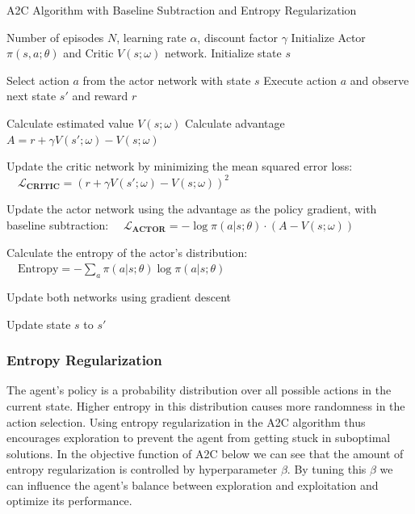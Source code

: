 \documentclass{article}
\begin{document}
\begin{algorithm}[H]
    \caption{A2C Algorithm with Baseline Subtraction and Entropy Regularization}
  \label{alg:A2C}
  \begin{algorithmic}[1]
      \REQUIRE Number of episodes $N$, learning rate $\alpha$, discount factor $\gamma$
      \STATE Initialize Actor $\pi(s, a; \theta)$ and Critic $V(s; \omega)$ network.
          \STATE Initialize state $s$
    
              \STATE Select action $a$ from the actor network with state $s$
              \STATE Execute action $a$ and observe next state $s'$ and reward $r$
      
              \STATE Calculate estimated value $V(s; \omega)$
              \STATE Calculate advantage $A = r + \gamma V(s'; \omega) - V(s; \omega)$
      
              \STATE Update the critic network by minimizing the mean squared error loss:
              \STATE $\quad \mathcal{L}_{\textbf{CRITIC}} = (r + \gamma V(s'; \omega) - V(s; \omega))^2$
      
              \STATE Update the actor network using the advantage as the policy gradient, with baseline subtraction:
              \STATE $\quad \mathcal{L}_{\textbf{ACTOR}} = -\log \pi(a|s; \theta) \cdot (A - V(s; \omega))$
      
              \STATE Calculate the entropy of the actor's distribution:
              \STATE $\quad \text{Entropy} = -\sum_{a} \pi(a|s; \theta) \log \pi(a|s; \theta)$
      
              \STATE Update both networks using gradient descent
      
              \STATE Update state $s$ to $s'$
      \ENDWHILE
      \ENDFOR
    \end{algorithmic}
\end{algorithm}

\subsubsection{Entropy Regularization}
\label{sssec:entreg}

The agent's policy is a probability distribution over all possible actions in the current state.
Higher entropy in this distribution causes more randomness in the action selection.
Using entropy regularization in the A2C algorithm thus encourages exploration to prevent the agent from getting stuck in suboptimal solutions.
In the objective function of A2C below we can see that the amount of entropy regularization is controlled by hyperparameter $\beta$.
By tuning this $\beta$ we can influence the agent's balance between exploration and exploitation and optimize its performance.
\end{document}
